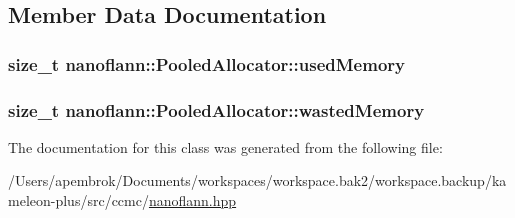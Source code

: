 \subsection{Member Data Documentation}
\hypertarget{classnanoflann_1_1_pooled_allocator_a4152d7a1d043d57aad464f11117d6e90}{
\subsubsection[{used\-Memory}]{\setlength{\rightskip}{0pt plus 5cm}size\-\_\-t nanoflann\-::\-Pooled\-Allocator\-::used\-Memory}}\label{classnanoflann_1_1_pooled_allocator_a4152d7a1d043d57aad464f11117d6e90}
\hypertarget{classnanoflann_1_1_pooled_allocator_aeb073342f83393f414888292d165738d}{
\subsubsection[{wasted\-Memory}]{\setlength{\rightskip}{0pt plus 5cm}size\-\_\-t nanoflann\-::\-Pooled\-Allocator\-::wasted\-Memory}}\label{classnanoflann_1_1_pooled_allocator_aeb073342f83393f414888292d165738d}


The documentation for this class was generated from the following file\-:\begin{DoxyCompactItemize}
\item 
/\-Users/apembrok/\-Documents/workspaces/workspace.\-bak2/workspace.\-backup/kameleon-\/plus/src/ccmc/\hyperlink{nanoflann_8hpp}{nanoflann.\-hpp}\end{DoxyCompactItemize}
